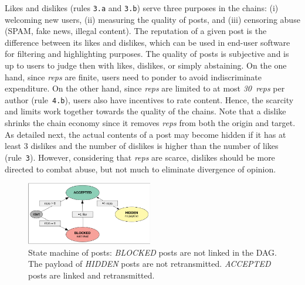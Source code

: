 \documentclass[10pt,journal,compsoc]{IEEEtran}
\newcommand{\reps}     {\emph{reps}\xspace}
\newcommand{\nreps}[1] {\emph{#1~reps\xspace}}
\begin{document}
Likes and dislikes (rules \texttt{3.a} and \texttt{3.b}) serve three purposes
in the chains:
    (i) welcoming new users,
    (ii) measuring the quality of posts, and
    (iii) censoring abuse (SPAM, fake news, illegal content).
%
The reputation of a given post is the difference between its likes and
dislikes, which can be used in end-user software for filtering and highlighting
purposes.
%
The quality of posts is subjective and is up to users to judge then with likes,
dislikes, or simply abstaining.
On the one hand, since \reps are finite, users need to ponder to avoid
indiscriminate expenditure.
On the other hand, since \reps are limited to at most \nreps{30} per author
(rule~\texttt{4.b}), users also have incentives to rate content.
Hence, the scarcity and limits work together towards the quality of the chains.
%
Note that a dislike shrinks the chain economy since it removes \reps from both
the origin and target.
As detailed next, the actual contents of a post may become hidden if it has at
least 3 dislikes and the number of dislikes is higher than the number of likes
(rule~\texttt{3}).
However, considering that \reps are scarce, dislikes should be more directed to
combat abuse, but not much to eliminate divergence of opinion.

\begin{figure}[ht]
\centering
\includegraphics[width=0.49\textwidth]{state.png}
\caption{
    State machine of posts:
    \emph{BLOCKED} posts are not linked in the DAG.
    The payload of \emph{HIDDEN} posts are not retransmitted.
    \emph{ACCEPTED} posts are linked and retransmitted.
}
\label{fig.state}
\end{figure}
\end{document}
